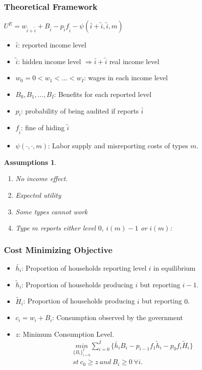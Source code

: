 \documentclass[xcolor=pdftex,dvipsnames,table]{beamer}
\newtheorem{assum}{Assumptions}
\begin{document}
\begin{frame}[label=theory]
 \frametitle{Theoretical Framework}
 \begin{center}
$U^E=w_{\bar{i}+\tilde{i}}+B_{\bar{i}}-p_{\bar{i}}f_{\tilde{i}}-\psi(\bar{i}+\tilde{i},\tilde{i},m)$ 
 \end{center}
\begin{itemize}
\item $\bar{i}$: reported income level 
\item $\tilde{i}$: hidden income level $\Rightarrow \bar{i}+\tilde{i}$ real income level
\item $w_0=0<w_1<...<w_I$: wages in each income level 
\item $B_0,B_1,...,B_I$: Benefits for each reported level
\item $p_{\bar{i}}$: probability of being audited if reports $\bar{i}$
\item $f_{\tilde{i}}$: fine of hiding $\tilde{i}$
\item $\psi(\cdot,\cdot,m)$: Labor supply and misreporting costs of types $m$.
\end{itemize}
 \begin{assum}
\begin{enumerate}
\item No income effect. 
\item Expected utility 
\item Some types cannot work
\item Type $m$ reports either level $0$, $i(m)-1$ or $i(m)$:
\end{enumerate}
\end{assum}
\hyperlink{implications}{}
\end{frame}

\begin{frame}[label=imp]
 \frametitle{Cost Minimizing Objective}
\begin{itemize}
\item $\bar{h}_i$: Proportion of households reporting level $i$ in equilibrium
\item $\tilde{h}_i$: Proportion of households producing $i$ but reporting $i-1$.
\item $\tilde{H}_i$: Proportion of households producing $i$ but reporting $0$.
\item $c_i=w_i+B_i$: Consumption observed by the government
\item $z$: Minimum Consumption Level.
\begin{align*}
	\underset{\{B_i\}_{i=0}^I}{min} \sum_{i=0}^I \{\bar{h}_iB_i-p_{i-1}f_1\tilde{h}_i-p_0f_i\tilde{H}_i\} \nonumber\\
	st\ c_0 \geq z\ and\ B_i\geq0\ \forall i. \nonumber
\end{align*}
\end{itemize}
\end{frame}
\end{document}
